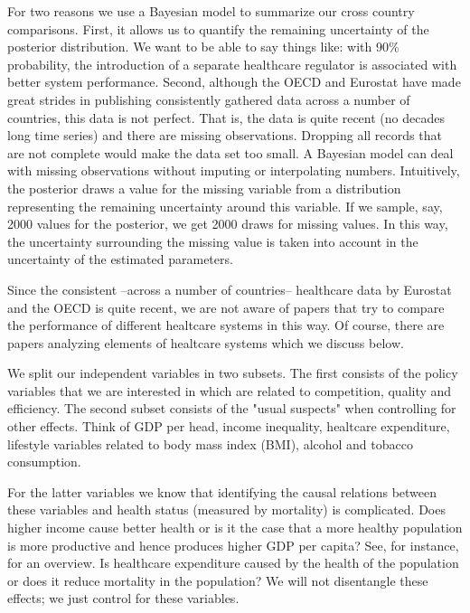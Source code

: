 \documentclass[12pt,english,a4paper]{article}
\begin{document}
For two reasons we use a Bayesian model to summarize our cross country comparisons. First, it allows us to quantify the remaining uncertainty of the posterior distribution. We want to be able to say things like: with 90\% probability, the introduction of a separate healthcare regulator is associated with better system performance. Second, although the OECD and Eurostat have made great strides in publishing consistently gathered data across a number of countries, this data is not perfect. That is, the data is quite recent (no decades long time series) and there are missing observations. Dropping all records that are not complete would make the data set too  small. A Bayesian model can deal with missing observations without imputing or interpolating numbers. Intuitively, the posterior draws a value for the missing variable from a distribution representing the remaining uncertainty around this variable. If we sample, say, 2000 values for the posterior, we get 2000 draws for missing values. In this way, the uncertainty surrounding the missing value is taken into account in the uncertainty of the estimated parameters.

Since the consistent --across a number of countries-- healthcare data by Eurostat and the OECD is quite recent, we are not aware of papers that try to compare the performance of different healtcare systems in this way. Of course, there are papers analyzing elements of healtcare systems which we discuss below.

We split our independent variables in two subsets. The first consists of the policy variables that we are interested in which are related to competition, quality and efficiency. The second subset consists of the "usual suspects" when controlling for other effects. Think of GDP per head, income inequality, healtcare expenditure, lifestyle variables related to body mass index (BMI), alcohol and tobacco consumption.

For the latter variables we know that identifying the causal relations between these variables and health status (measured by mortality) is complicated. Does higher income cause better health or is it the case that a more healthy population is more productive and hence produces higher GDP per capita? See, for instance, \cite{socioeconomicstatus} for an overview. Is healthcare expenditure caused by the health of the population or does it reduce mortality in the population? We will not disentangle these effects; we just control for these variables.
\end{document}
